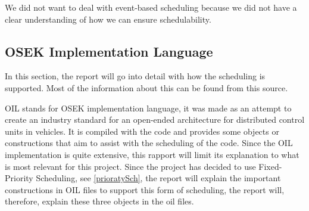 We did not want to deal with event-based scheduling because we did not have a clear understanding of how we can ensure schedulability.

\subsection{\textbf{OSEK Implementation Language}}\label{OILteo}
In this section, the report will go into detail with how the scheduling is supported. Most of the information about this can be found from this source\cite{OILManual}.

OIL stands for OSEK implementation language, it was made as an attempt to create an industry standard for an open-ended architecture for distributed control units in vehicles\cite{OILManual}. It is compiled with the code and provides some objects or constructions that aim to assist with the scheduling of the code. Since the OIL implementation is quite extensive, this rapport will limit its explanation to what is most relevant for this project. Since the project has decided to use Fixed-Priority Scheduling, see \ref{prioratySch}, the report will explain the important constructions in OIL files to support this form of scheduling, the report will, therefore, explain these three objects in the oil files.

